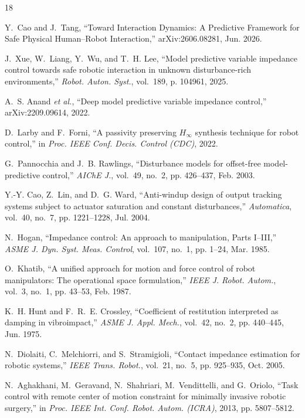\begin{thebibliography}{18}
\fontsize{7.5}{8.2}\selectfont
\setlength{\itemsep}{0pt}

Y.~Cao and J.~Tang, ``Toward Interaction Dynamics: A Predictive Framework for Safe Physical Human--Robot Interaction,'' arXiv:2606.08281, Jun. 2026.

J.~Xue, W.~Liang, Y.~Wu, and T.~H. Lee, ``Model predictive variable impedance control towards safe robotic interaction in unknown disturbance-rich environments,'' \emph{Robot. Auton. Syst.}, vol.~189, p. 104961, 2025.

A.~S. Anand \emph{et al.}, ``Deep model predictive variable impedance control,'' arXiv:2209.09614, 2022.

D.~Larby and F.~Forni, ``A passivity preserving $H_\infty$ synthesis technique for robot control,'' in \emph{Proc. IEEE Conf. Decis. Control (CDC)}, 2022.

G.~Pannocchia and J.~B. Rawlings, ``Disturbance models for offset-free model-predictive control,'' \emph{AIChE J.}, vol.~49, no.~2, pp. 426--437, Feb. 2003.

Y.-Y. Cao, Z.~Lin, and D.~G. Ward, ``Anti-windup design of output tracking systems subject to actuator saturation and constant disturbances,'' \emph{Automatica}, vol.~40, no.~7, pp. 1221--1228, Jul. 2004.

N.~Hogan, ``Impedance control: An approach to manipulation, Parts I--III,'' \emph{ASME J. Dyn. Syst. Meas. Control}, vol.~107, no.~1, pp. 1--24, Mar. 1985.

O.~Khatib, ``A unified approach for motion and force control of robot manipulators: The operational space formulation,'' \emph{IEEE J. Robot. Autom.}, vol.~3, no.~1, pp. 43--53, Feb. 1987.

K.~H. Hunt and F.~R.~E. Crossley, ``Coefficient of restitution interpreted as damping in vibroimpact,'' \emph{ASME J. Appl. Mech.}, vol.~42, no.~2, pp. 440--445, Jun. 1975.

N.~Diolaiti, C.~Melchiorri, and S.~Stramigioli, ``Contact impedance estimation for robotic systems,'' \emph{IEEE Trans. Robot.}, vol.~21, no.~5, pp. 925--935, Oct. 2005.

N.~Aghakhani, M.~Geravand, N.~Shahriari, M.~Vendittelli, and G.~Oriolo, ``Task control with remote center of motion constraint for minimally invasive robotic surgery,'' in \emph{Proc. IEEE Int. Conf. Robot. Autom. (ICRA)}, 2013, pp. 5807--5812.


\end{thebibliography}
